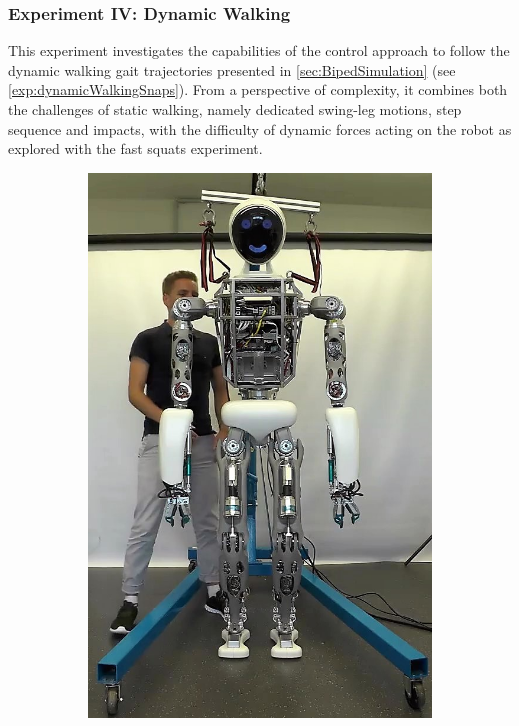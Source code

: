 \subsubsection{Experiment IV: Dynamic Walking}
This experiment investigates the capabilities of the control approach to follow the dynamic walking gait trajectories presented in \cref{sec:BipedSimulation} (see \cref{exp:dynamicWalkingSnaps}). From a perspective of complexity, it combines both the challenges of static walking, namely dedicated swing-leg motions, step sequence and impacts, with the difficulty of dynamic forces acting on the robot as explored with the fast squats experiment.
\begin{figure}
\begin{subfigure}{.2\textwidth}
	\includegraphics[width=.95\linewidth]{experiments/walkDynamic/snaps/1}

\end{subfigure}
\end{figure}
